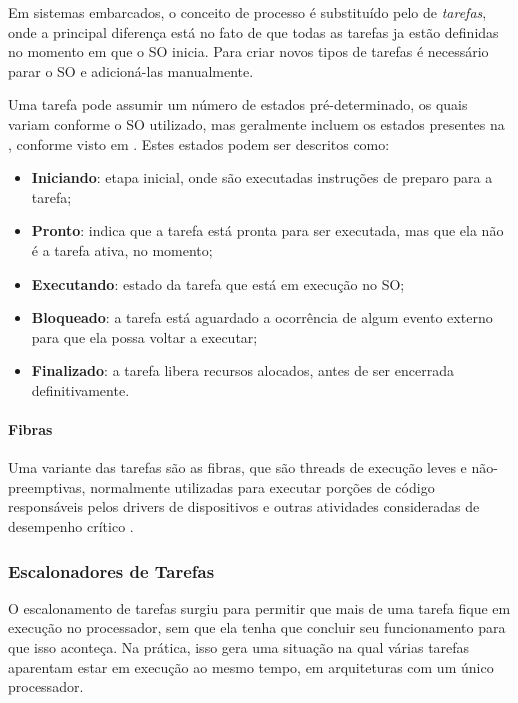 Em sistemas embarcados, o conceito de processo é substituído pelo de \emph{tarefas}, onde a principal diferença está no fato de que todas as tarefas ja estão definidas no momento em que o SO inicia. Para criar novos tipos de tarefas é necessário parar o SO e adicioná-las manualmente.

Uma tarefa pode assumir um número de estados pré-determinado, os quais variam conforme o SO utilizado, mas geralmente incluem os estados presentes na , conforme visto em . Estes estados podem ser descritos como:

\begin{itemize}
	\item \textbf{Iniciando}: etapa inicial, onde são executadas instruções de preparo para a tarefa;
	\item \textbf{Pronto}: indica que a tarefa está pronta para ser executada, mas que ela não é a tarefa ativa, no momento;
	\item \textbf{Executando}: estado da tarefa que está em execução no SO;
	\item \textbf{Bloqueado}: a tarefa está aguardado a ocorrência de algum evento externo para que ela possa voltar a executar;
	\item \textbf{Finalizado}: a tarefa libera recursos alocados, antes de ser encerrada definitivamente.
\end{itemize}


\paragraph{Fibras}

Uma variante das tarefas são as fibras, que são threads de execução leves e não-preemptivas, normalmente utilizadas para executar porções de código responsáveis pelos drivers de dispositivos e outras atividades consideradas de desempenho crítico \cite{rocket}.

\subsubsection{Escalonadores de Tarefas}

O escalonamento de tarefas surgiu para permitir que mais de uma tarefa fique em execução no processador, sem que ela tenha que concluir seu funcionamento para que isso aconteça. Na prática, isso gera uma situação na qual várias tarefas aparentam estar em execução ao mesmo tempo, em arquiteturas com um único processador.

